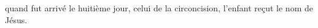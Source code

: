 \encetemps quand fut arrivé le huitième jour, celui de la circoncision,
	l’enfant reçut le nom de Jésus.
